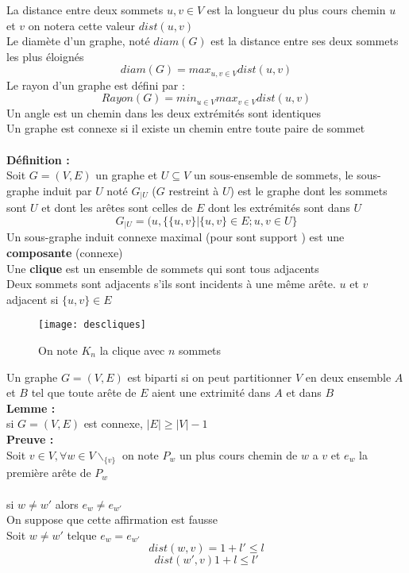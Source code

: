 \documentclass{report}
\newcommand{\deffinition}{\textcolor[rgb]{0.65,0,0.7}{Définition : }}
\newcommand{\Def}{\textbf{\deffinition}}
\newcommand{\preuve}{\textcolor[rgb]{0.95,0.25,0}{Preuve : }}
\newcommand{\Preuve}{\textbf{\preuve}}
\newcommand{\lemme}{\textcolor[rgb]{0,0.2,0.80}{Lemme : }}
\newcommand{\Lemme}{\textbf{\lemme}}
\begin{document}
La distance entre deux sommets $u,v \in V$ est la longueur du plus cours chemin $u$ et $v$ on notera cette valeur $dist(u,v)$\\
Le diamète d'un graphe, noté $diam(G)$ est la distance entre ses deux sommets les plus éloignés\\
$$diam(G)=max_{u,v \in V} dist(u,v)$$
Le rayon d'un graphe est défini par :\\
$$Rayon(G)= min_{u\in V} max_{v \in V} dist(u,v)$$
Un angle est un chemin dans les deux extrémités sont identiques\\
Un graphe est connexe si il existe un chemin entre toute paire de sommet\\\\

\Def\\
Soit $G=(V,E)$ un graphe et $U \subseteq V$ un sous-ensemble de sommets, le sous-graphe induit par $U$ noté $G_{|U}$ ($G$ restreint à $U$) est le graphe dont les sommets sont $U$ et dont les arêtes sont celles de $E$ dont les extrémités sont dans $U$\\
$$G_{|U}=(u,\{\{u,v\}|\{u,v\}\in E; u,v \in U\}$$
Un sous-graphe induit connexe maximal (pour sont support ) est une \textbf{composante} (connexe)\\
Une \textbf{clique} est un ensemble de sommets qui sont tous adjacents\\
Deux sommets sont adjacents s'ils sont incidents à une même arête. $u$ et $v$ adjacent si $\{u,v\} \in E$\\

\begin{figure}[h]
	\centering
		\texttt{[image: descliques]}
	\caption{On note $K_n$ la clique avec $n$ sommets}
	\label{descliques}
\end{figure}

Un graphe $G=(V,E)$ est biparti si on peut partitionner $V$ en deux ensemble $A$ et $B$ tel que toute arête de $E$ aient une extrimité dans $A$ et dans $B$\\

\Lemme\\
si $G=(V,E)$ est connexe, $|E|\geq|V|-1$\\

\Preuve\\
Soit $v\in V, \forall w \in V\backslash_{\{v\}}$ on note $P_w$ un plus cours chemin de $w$ a $v$ et $e_w$ la première arête de  $P_w$\\\\
si $w\neq w'$ alors $e_w\neq e_{w'}$\\
On suppose que cette affirmation est fausse\\
Soit $w\neq w'$ telque $e_w=e_{w'}$\\
$$dist(w,v)=1+l'\leq l$$
$$dist(w',v)1+l\leq l'$$
\end{document}
